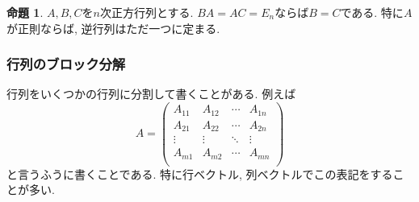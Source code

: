 \documentclass[dvipdfmx,a4paper,11pt]{article} %
\theoremstyle{definition}
\newtheorem{prop}[thm]{命題}
\begin{document}
 
\begin{prop}\cite[命題 2.1.1]{O}
$A, B, C$を$n$次正方行列とする. 
$BA=AC=E_n$ならば$B=C$である. 
特に$A$が正則ならば, 逆行列はただ一つに定まる. 
\end{prop}



\subsubsection{行列のブロック分解}
 行列をいくつかの行列に分割して書くことがある.
例えば
$$
A = \begin{pmatrix}
A_{11}& A_{12} & \cdots &A_{1n}\\
A_{21}& A_{22} & \cdots &A_{2n}\\
\vdots& \vdots	&	\ddots   &	\vdots \\
A_{m1}& A_{m2} & \cdots &A_{mn} \\
\end{pmatrix}
$$
と言うふうに書くことである.
特に行ベクトル, 列ベクトルでこの表記をすることが多い.
\end{document}
